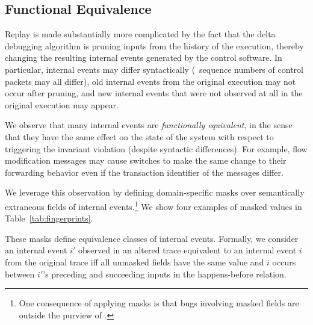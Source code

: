 \subsection{Functional Equivalence}
\label{subsec:functional_equivalence}

Replay is made substantially more complicated by the fact
that the delta debugging algorithm is pruning inputs from the history of the
execution, thereby changing the resulting internal events generated by the control
software. In particular, internal events may differ syntactically (\eg~sequence numbers
of control packets may all differ), old internal events from the original
execution may not occur after pruning, and new internal events that were not
observed at all in the original execution may appear.

We observe that many internal events are {\em functionally
equivalent}, in the sense that they
have the same effect on the state of the system with respect to triggering the
invariant violation (despite syntactic differences). For example, flow
modification messages may cause switches to make the same change to their forwarding behavior
even if the transaction identifier of the messages differ.

We leverage this observation by defining
domain-specific masks over semantically extraneous fields of
internal events.\footnote{One consequence
of applying masks is that bugs involving masked fields are outside the purview of
\simulator.} We show four examples of masked values
in Table~\ref{tab:fingerprints}.

These masks define equivalence classes
of internal events. Formally, we consider an internal event $i'$ observed in an altered trace
equivalent to an internal event $i$ from the original trace iff all unmasked
fields have the same value
and $i$ occurs between $i'$'s preceding and succeeding inputs in the
happens-before relation.


